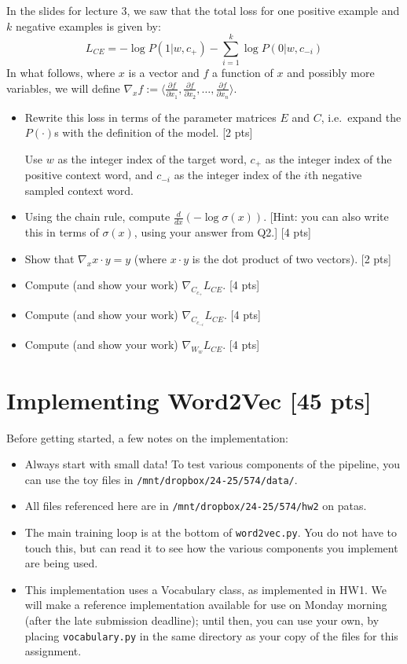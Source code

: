 \documentclass[11pt]{article}
\begin{document}
\vspace{2em}
  In the slides for lecture 3, we saw that the total loss for one positive example and $k$ negative examples is given by:
$$ L_{CE} = -\log P(1 | w, c_+) - \sum_{i=1}^k \log P(0 | w, c_{-i})$$
In what follows, where $x$ is a vector and $f$ a function of $x$ and possibly more variables, we will define $\nabla_x f := \langle \frac{\partial f}{\partial x_1} , \frac{\partial f}{\partial x_2}, \dots , \frac{\partial f}{\partial x_n} \rangle$.
\begin{itemize}
  \item Rewrite this loss in terms of the parameter matrices $E$ and $C$, i.e.\ expand the $P(\cdot)$s with the definition of the model. [2 pts]

        Use $w$ as the integer index of the target word, $c_+$ as the integer index of the positive context word, and $c_{-i}$ as the integer index of the $i$th negative sampled context word.
  \item Using the chain rule, compute $\frac{d}{dx}\left(-\log\sigma(x)\right)$.  [Hint: you can also write this in terms of $\sigma(x)$, using your answer from Q2.] [4 pts]
  \item Show that $\nabla_x x \cdot y = y$ (where $x \cdot y$ is the dot product of two vectors). [2 pts]
  \item Compute (and show your work) $\nabla_{C_{c_+}} L_{CE}$. [4 pts]
  \item Compute (and show your work) $\nabla_{C_{c_{-i}}} L_{CE}$. [4 pts]
  \item Compute (and show your work) $\nabla_{W_w} L_{CE}$. [4 pts]
\end{itemize}


\section{Implementing Word2Vec [45 pts]}

Before getting started, a few notes on the implementation:
\begin{itemize}
  \item Always start with small data!  To test various components of the pipeline, you can use the toy files in \texttt{/mnt/dropbox/24-25/574/data/}.
  \item All files referenced here are in \texttt{/mnt/dropbox/24-25/574/hw2} on patas.
  \item The main training loop is at the bottom of \texttt{word2vec.py}.  You do not have to touch this, but can read it to see how the various components you implement are being used.
  \item This implementation uses a Vocabulary class, as implemented in HW1.  We will make a reference implementation available for use on Monday morning (after the late submission deadline); until then, you can use your own, by placing \texttt{vocabulary.py} in the same directory as your copy of the files for this assignment.
\end{itemize}
\end{document}
